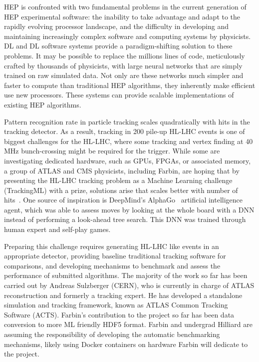 HEP is confronted with two fundamental problems in the current
generation of HEP experimental software: the inability to take
advantage and adapt to the rapidly evolving processor landscape, and
the difficulty in developing and maintaining increasingly complex
software and computing systems by physicists. DL and DL software
systems provide a paradigm-shifting solution to these problems. It may
be possible to replace the millions lines of code, meticulously
crafted by thousands of physicists, with large neural networks that
are simply trained on raw simulated data. Not only are these networks
much simpler and faster to compute than traditional HEP algorithms,
they inherently make efficient use new processors. These systems can
provide scalable implementations of existing HEP algorithms.


Pattern recognition rate in particle tracking scales quadratically
with hits in the tracking detector. As a result, tracking in 200
pile-up HL-LHC events is one of biggest challenges for the HL-LHC,
where some tracking and vertex finding at 40 MHz bunch-crossing might
be required for the trigger. While some are investigating dedicated
hardware, such as GPUs, FPGAs, or associated memory, a group of ATLAS
and CMS physicists, including Farbin, are hoping that by presenting
the HL-LHC tracking problem as a Machine Learning challenge
(TrackingML) with a prize, solutions arise that scales better with
number of hits~\cite{}. One source of inspiration is DeepMind's
AlphaGo~\cite{} artificial intelligence agent, which was able to
assess moves by looking at the whole board with a DNN instead of
performing a look-ahead tree search. This DNN was trained through
human expert and self-play games.

Preparing this challenge requires generating HL-LHC like events in an
appropriate detector, providing baseline traditional tracking software
for comparisons, and developing mechanisms to benchmark and assess the
performance of submitted algorithms. The majority of the work so far
has been carried out by Andreas Sulzberger (CERN), who is currently in
charge of ATLAS reconstruction and formerly a tracking expert. He has
developed a standalone simulation and tracking framework, known as
ATLAS Common Tracking Software (ACTS). Farbin's contribution to the
project so far has been data conversion to more ML friendly HDF5
format. Farbin and undergrad Hilliard are assuming the responsibility
of developing the automatic benchmarking mechanisms, likely using
Docker containers on hardware Farbin will dedicate to the project.



